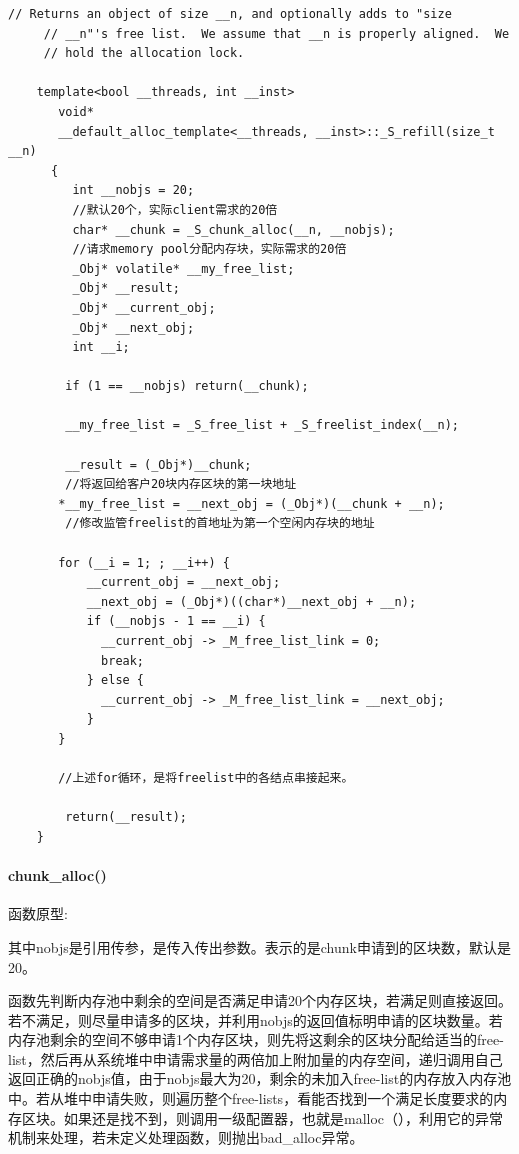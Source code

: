 \documentclass[UTF8,a4paper,12pt]{ctexbook}
\begin{document}
			\begin{lstlisting}[frame = lines]
	 // Returns an object of size __n, and optionally adds to "size  
	 // __n"'s free list.  We assume that __n is properly aligned.  We  
	 // hold the allocation lock.  
	   
	template<bool __threads, int __inst>  
	   void*  
	   __default_alloc_template<__threads, __inst>::_S_refill(size_t __n)  
	  {  
	     int __nobjs = 20;   
	     //默认20个，实际client需求的20倍  
	     char* __chunk = _S_chunk_alloc(__n, __nobjs);  
	     //请求memory pool分配内存块，实际需求的20倍  
	     _Obj* volatile* __my_free_list;  
	     _Obj* __result;  
	     _Obj* __current_obj;  
	     _Obj* __next_obj;  
	     int __i;  
	       
	    if (1 == __nobjs) return(__chunk);  
	     
	    __my_free_list = _S_free_list + _S_freelist_index(__n);  
	       
	    __result = (_Obj*)__chunk;   
	    //将返回给客户20块内存区块的第一块地址  
	   *__my_free_list = __next_obj = (_Obj*)(__chunk + __n);  
	    //修改监管freelist的首地址为第一个空闲内存块的地址  
	  
	   for (__i = 1; ; __i++) {  
	       __current_obj = __next_obj;  
	       __next_obj = (_Obj*)((char*)__next_obj + __n);  
	       if (__nobjs - 1 == __i) {  
	         __current_obj -> _M_free_list_link = 0;  
	         break;  
	       } else {  
	         __current_obj -> _M_free_list_link = __next_obj;  
	       }  
	   }  
	  
	   //上述for循环，是将freelist中的各结点串接起来。  
	  
	    return(__result);  
	}  
			\end{lstlisting}
					
		\paragraph{chunk\_alloc()}
			函数原型:
			
			其中nobjs是引用传参，是传入传出参数。表示的是chunk申请到的区块数，默认是20。
			
			函数先判断内存池中剩余的空间是否满足申请20个内存区块，若满足则直接返回。若不满足，则尽量申请多的区块，并利用nobjs的返回值标明申请的区块数量。若内存池剩余的空间不够申请1个内存区块，则先将这剩余的区块分配给适当的free-list，然后再从系统堆中申请需求量的两倍加上附加量的内存空间，递归调用自己返回正确的nobjs值，由于nobjs最大为20，剩余的未加入free-list的内存放入内存池中。若从堆中申请失败，则遍历整个free-lists，看能否找到一个满足长度要求的内存区块。如果还是找不到，则调用一级配置器，也就是malloc（），利用它的异常机制来处理，若未定义处理函数，则抛出bad\_alloc异常。
			
\end{document}
